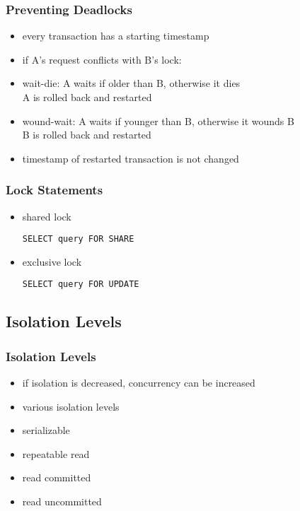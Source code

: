\documentclass[dvipsnames]{beamer}
\theoremstyle{plain}
\begin{document}
\begin{frame}
  \frametitle{Preventing Deadlocks}

  \begin{itemize}
    \item every transaction has a starting timestamp
    \item if A's request conflicts with B's lock:

    \pause
    \item \alert{wait-die}: A waits if older than B, otherwise it dies\\
      A is rolled back and restarted

    \item \alert{wound-wait}: A waits if younger than B, otherwise it wounds B\\
      B is rolled back and restarted

    \pause
    \item timestamp of restarted transaction is not changed
  \end{itemize}
\end{frame}

\begin{frame}[fragile]
  \frametitle{Lock Statements}

  \begin{itemize}
    \item shared lock
    \begin{lstlisting}
SELECT query FOR SHARE
    \end{lstlisting}

    \item exclusive lock
    \begin{lstlisting}
SELECT query FOR UPDATE
    \end{lstlisting}
  \end{itemize}
\end{frame}

\subsection{Isolation Levels}

\begin{frame}
  \frametitle{Isolation Levels}

  \begin{itemize}
    \item if isolation is decreased, concurrency can be increased
    \item various isolation levels

    \medskip
    \item serializable
    \item repeatable read
    \item read committed
    \item read uncommitted
  \end{itemize}
\end{frame}
\end{document}
